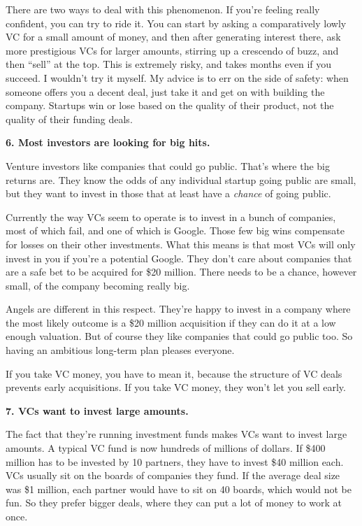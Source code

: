 There are two ways to deal with this phenomenon. If you're feeling
really confident, you can try to ride it. You can start by asking a
comparatively lowly VC for a small amount of money, and then after
generating interest there, ask more prestigious VCs for larger amounts,
stirring up a crescendo of buzz, and then ``sell'' at the top. This is
extremely risky, and takes months even if you succeed. I wouldn't try it
myself. My advice is to err on the side of safety: when someone offers
you a decent deal, just take it and get on with building the company.
Startups win or lose based on the quality of their product, not the
quality of their funding deals.

\textbf{6. Most investors are looking for big hits.}

Venture investors like companies that could go public. That's where the
big returns are. They know the odds of any individual startup going
public are small, but they want to invest in those that at least have a
\emph{chance} of going public.

Currently the way VCs seem to operate is to invest in a bunch of
companies, most of which fail, and one of which is Google. Those few big
wins compensate for losses on their other investments. What this means
is that most VCs will only invest in you if you're a potential Google.
They don't care about companies that are a safe bet to be acquired for
\$20 million. There needs to be a chance, however small, of the company
becoming really big.

Angels are different in this respect. They're happy to invest in a
company where the most likely outcome is a \$20 million acquisition if
they can do it at a low enough valuation. But of course they like
companies that could go public too. So having an ambitious long-term
plan pleases everyone.

If you take VC money, you have to mean it, because the structure of VC
deals prevents early acquisitions. If you take VC money, they won't let
you sell early.

\textbf{7. VCs want to invest large amounts.}

The fact that they're running investment funds makes VCs want to invest
large amounts. A typical VC fund is now hundreds of millions of dollars.
If \$400 million has to be invested by 10 partners, they have to invest
\$40 million each. VCs usually sit on the boards of companies they fund.
If the average deal size was \$1 million, each partner would have to sit
on 40 boards, which would not be fun. So they prefer bigger deals, where
they can put a lot of money to work at once.

